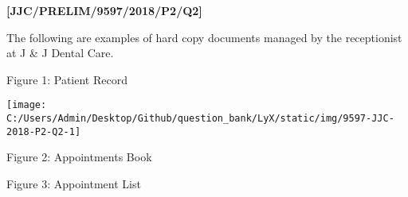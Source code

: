 \item \textbf{{[}JJC/PRELIM/9597/2018/P2/Q2{]} }

The following are examples of hard copy documents managed by the receptionist
at J \& J Dental Care. 

\noindent{}
\noindent \begin{center}
Figure 1: Patient Record
\par\end{center}

\begin{center}
\texttt{[image: C:/Users/Admin/Desktop/Github/question\_bank/LyX/static/img/9597-JJC-2018-P2-Q2-1]}
\par\end{center}

\noindent \begin{center}
Figure 2: Appointments Book 
\par\end{center}

\noindent{}
\noindent \begin{center}
Figure 3: Appointment List
\par\end{center}


